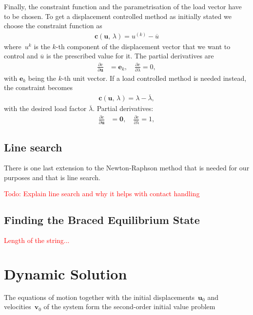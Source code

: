 Finally, the constraint function and the parametrisation of the load vector have to be chosen. To get a displacement controlled method as initially stated we choose the constraint function as
%
\begin{align}
\boldsymbol{c}(\boldsymbol{u},\,\lambda) = u^{(k)} - \overline{u}
\end{align}
%
where~$u^k$ is the $k$-th component of the displacement vector that we want to control and $\overline{u}$ is the prescribed value for it. The partial derivatives are
%
\begin{align*}
\frac{\partial c}{\partial \boldsymbol{u}} &= \boldsymbol{e}_k,\quad
\frac{\partial c}{\partial \lambda} = 0,
\end{align*}
%
with $\boldsymbol{e}_k$ being the $k$-th unit vector. If a load controlled method is needed instead, the constraint becomes
%
\begin{align}
\boldsymbol{c}(\boldsymbol{u},\,\lambda) = \lambda - \overline{\lambda},
\end{align}
%
with the desired load factor $\overline{\lambda}$. Partial derivatives:
%
\begin{align*}
\frac{\partial c}{\partial \boldsymbol{u}} &= \boldsymbol{0},\quad
\frac{\partial c}{\partial \lambda} = 1,
\end{align*}

\subsection{Line search}

There is one last extension to the Newton-Raphson method that is needed for our purposes and that is line search. 

\textcolor{red}{Todo: Explain line search and why it helps with contact handling}

\newpage
\subsection{Finding the Braced Equilibrium State}

\textcolor{red}{Length of the string...}

\section{Dynamic Solution}

The equations of motion together with the initial displacements~$\boldsymbol{u}_0$ and velocities~$\boldsymbol{v}_0$ of the system form the second-order initial value problem


